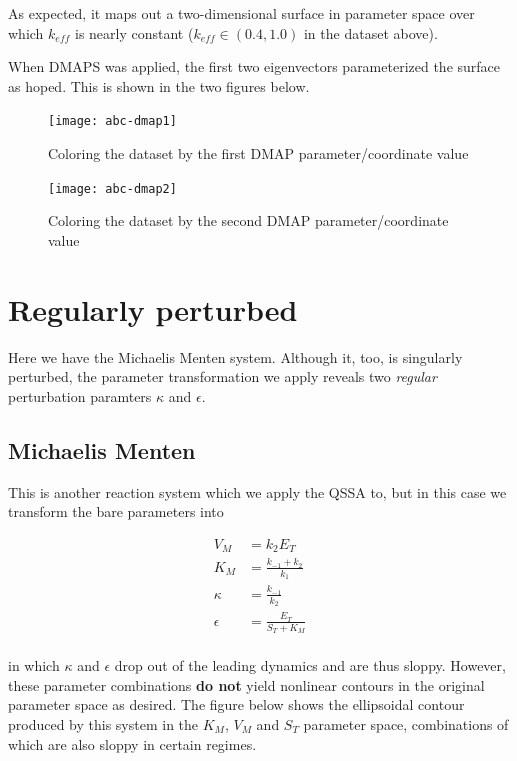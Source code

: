 \documentclass[11pt]{article}
\begin{document}
As expected, it maps out a two-dimensional surface in parameter space over which $k_{eff}$ is nearly constant ($k_{eff} \in (0.4, 1.0)$ in the dataset above).

When DMAPS was applied, the first two eigenvectors parameterized the surface as hoped. This is shown in the two figures below.

\begin{figure}[htbp]
  \centering
  \texttt{[image: abc-dmap1]}
  \caption{Coloring the dataset by the first DMAP parameter/coordinate value}
\end{figure}

\begin{figure}[htbp]
  \centering
  \texttt{[image: abc-dmap2]}
  \caption{Coloring the dataset by the second DMAP parameter/coordinate value}
\end{figure}

\section{Regularly perturbed}

Here we have the Michaelis Menten system. Although it, too, is singularly perturbed, the parameter transformation we apply reveals two \textit{regular} perturbation paramters $\kappa$ and $\epsilon$.

\subsection{Michaelis Menten}

This is another reaction system which we apply the QSSA to, but in this case we transform the bare parameters into 

\begin{align*}
  V_M &= k_2 E_T \\
  K_M &= \frac{k_{-1} + k_2}{k_1} \\
  \kappa &= \frac{k_{-1}}{k_2} \\
  \epsilon &= \frac{E_T}{S_T + K_M} \\
\end{align*}

in which $\kappa$ and $\epsilon$ drop out of the leading dynamics and are thus sloppy. However, these parameter combinations \textbf{do not} yield nonlinear contours in the original parameter space as desired. The figure below shows the ellipsoidal contour produced by this system in the $K_M$, $V_M$ and $S_T$ parameter space, combinations of which are also sloppy in certain regimes.
\end{document}
